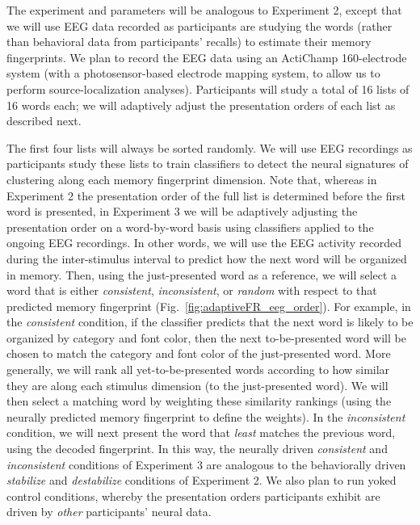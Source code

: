The experiment and parameters will be analogous to Experiment 2, except that we
will use EEG data recorded as participants are studying the words (rather than
behavioral data from participants' recalls) to estimate their memory
fingerprints. We plan to record the EEG data using an ActiChamp 160-electrode
system (with a photosensor-based electrode mapping system, to allow us to
perform source-localization analyses). Participants will study a total of 16
lists of 16 words each; we will adaptively adjust the presentation orders of
each list as described next.

The first four lists will always be sorted randomly. We will use EEG recordings
as participants study these lists to train classifiers to detect the neural
signatures of clustering along each memory fingerprint dimension. Note that,
whereas in Experiment 2 the presentation order of the full list is determined
before the first word is presented, in Experiment 3 we will be adaptively
adjusting the presentation order on a word-by-word basis using classifiers
applied to the ongoing EEG recordings. In other words, we will use the EEG
activity recorded during the inter-stimulus interval to predict how the next
word will be organized in memory. Then, using the just-presented word as a
reference, we will select a word that is either \textit{consistent},
\textit{inconsistent}, or \textit{random} with respect to that predicted memory
fingerprint (Fig.~\ref{fig:adaptiveFR_eeg_order}). For example, in the
\textit{consistent} condition, if the classifier predicts that the next word is
likely to be organized by category and font color, then the next
to-be-presented word will be chosen to match the category and font color of the
just-presented word. More generally, we will rank all yet-to-be-presented words
according to how similar they are along each stimulus dimension (to the
just-presented word). We will then select a matching word by weighting these
similarity rankings (using the neurally predicted memory fingerprint to define
the weights). In the \textit{inconsistent} condition, we will next present the
word that \textit{least} matches the previous word, using the decoded
fingerprint. In this way, the neurally driven \textit{consistent} and
\textit{inconsistent} conditions of Experiment 3 are analogous to the
behaviorally driven \textit{stabilize} and \textit{destabilize} conditions of
Experiment 2. We also plan to run yoked control conditions, whereby the
presentation orders participants exhibit are driven by \textit{other}
participants' neural data.

